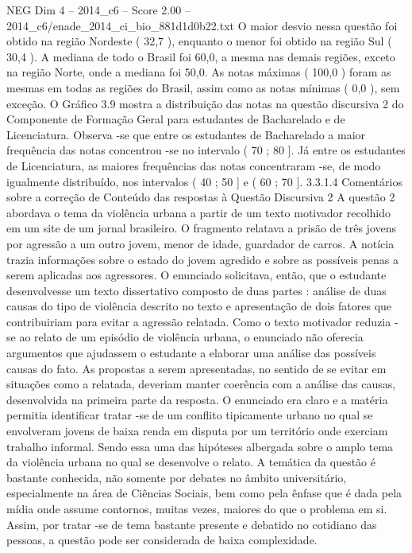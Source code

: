 \begin{textsample}{NEG Dim 4 – 2014\_c6 – Score 2.00 – 2014\_c6/enade\_2014\_ci\_bio\_881d1d0b22.txt}
O maior desvio nessa questão foi obtido na região Nordeste ( 32,7 ), enquanto o menor foi obtido na região Sul ( 30,4 ).
A mediana de todo o Brasil foi 60,0, a mesma nas demais regiões, exceto na região Norte, onde a mediana foi 50,0.
As notas máximas ( 100,0 ) foram as mesmas em todas as regiões do Brasil, assim como as notas mínimas ( 0,0 ), sem exceção.
O Gráfico 3.9 mostra a distribuição das notas na questão discursiva 2 do Componente de Formação Geral para estudantes de Bacharelado e de Licenciatura.
Observa -se que entre os estudantes de Bacharelado a maior frequência das notas concentrou -se no intervalo ( 70 ; 80 ].
Já entre os estudantes de Licenciatura, as maiores frequências das notas concentraram -se, de modo igualmente distribuído, nos intervalos ( 40 ; 50 ] e ( 60 ; 70 ]. 3.3.1.4 Comentários sobre a correção de Conteúdo das respostas à Questão Discursiva 2 A questão 2 abordava o tema da violência urbana a partir de um texto motivador recolhido em um site de um jornal brasileiro.
O fragmento relatava a prisão de três jovens por agressão a um outro jovem, menor de idade, guardador de carros.
A notícia trazia informações sobre o estado do jovem agredido e sobre as possíveis penas a serem aplicadas aos agressores.
O enunciado solicitava, então, que o estudante desenvolvesse um texto dissertativo composto de duas partes : análise de duas causas do tipo de violência descrito no texto e apresentação de dois fatores que contribuiriam para evitar a agressão relatada.
Como o texto motivador reduzia -se ao relato de um episódio de violência urbana, o enunciado não oferecia argumentos que ajudassem o estudante a elaborar uma análise das possíveis causas do fato.
As propostas a serem apresentadas, no sentido de se evitar em situações como a relatada, deveriam manter coerência com a análise das causas, desenvolvida na primeira parte da resposta.
O enunciado era claro e a matéria permitia identificar tratar -se de um conflito tipicamente urbano no qual se envolveram jovens de baixa renda em disputa por um território onde exerciam trabalho informal.
Sendo essa uma das hipóteses albergada sobre o amplo tema da violência urbana no qual se desenvolve o relato.
A temática da questão é bastante conhecida, não somente por debates no âmbito universitário, especialmente na área de Ciências Sociais, bem como pela ênfase que é dada pela mídia onde assume contornos, muitas vezes, maiores do que o problema em si.
Assim, por tratar -se de tema bastante presente e debatido no cotidiano das pessoas, a questão pode ser considerada de baixa complexidade.

\end{textsample}
